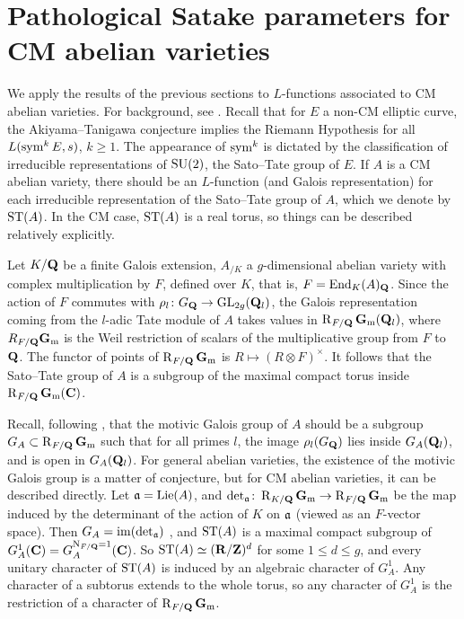 \section{Pathological Satake parameters for CM abelian varieties}

We apply the results of the previous sections to $L$-functions associated to 
CM abelian varieties. For background, see 
\cite{serre-tate-1968,serre-1994,yu-2015}. 
Recall that for $E$ a non-CM elliptic curve, the 
Akiyama--Tanigawa conjecture implies the Riemann Hypothesis for all 
$L(\operatorname{sym}^k E,s)$, $k\geqslant 1$. The appearance of $\operatorname{sym}^k$ is dictated by the 
classification of irreducible representations of $\operatorname{SU}(2)$, the Sato--Tate group 
of $E$. If $A$ is a CM abelian variety, there should be an $L$-function (and 
Galois representation) for each irreducible representation of the Sato--Tate 
group of $A$, which we denote by $\mathrm{ST}(A)$. In the 
CM case, $\mathrm{ST}(A)$ is a real torus, so things can be described relatively 
explicitly. 

Let $K/\mathbf{Q}$ be a finite Galois extension, $A_{/K}$ a $g$-dimensional abelian 
variety with complex multiplication by $F$, defined over $K$, that is, 
$F = \operatorname{End}_K(A)_{\mathbf{Q}}$. Since the action of $F$ commutes with 
$\rho_l\colon G_{\mathbf{Q}} \to \operatorname{GL}_{2g}(\mathbf{Q}_l)$, the Galois representation coming 
from the $l$-adic Tate module of $A$ takes values in $\operatorname{R}_{F/\mathbf{Q}}\mathbf{G}_\mathrm{m}(\mathbf{Q}_l)$, 
where $R_{F/\mathbf{Q}} \mathbf{G}_\mathrm{m}$ is the Weil restriction of scalars of the multiplicative 
group from $F$ to $\mathbf{Q}$. The functor of points of $\operatorname{R}_{F/\mathbf{Q}}\mathbf{G}_\mathrm{m}$ is 
$R\mapsto (R\otimes F)^\times$. It follows that the Sato--Tate group of $A$ is 
a subgroup of the maximal compact torus inside $\operatorname{R}_{F/\mathbf{Q}}\mathbf{G}_\mathrm{m}(\mathbf{C})$. 

Recall, following \cite{serre-1994}, that the motivic Galois group of $A$ 
should be a subgroup $G_A\subset \operatorname{R}_{F/\mathbf{Q}}\mathbf{G}_\mathrm{m}$ such that for all primes $l$, 
the image $\rho_l(G_{\mathbf{Q}})$ lies inside $G_A(\mathbf{Q}_l)$, and is open in 
$G_A(\mathbf{Q}_l)$. For general abelian varieties, the existence of the motivic 
Galois group is a matter of conjecture, but for CM abelian varieties, it can be 
described directly. Let $\mathfrak{a}=\operatorname{Lie}(A)$, and 
$\det_{\mathfrak{a}}\colon \operatorname{R}_{K/\mathbf{Q}}\mathbf{G}_\mathrm{m} \to \operatorname{R}_{F/\mathbf{Q}}\mathbf{G}_\mathrm{m}$ be the map induced by the 
determinant of the action of $K$ on $\mathfrak{a}$ (viewed as an $F$-vector space). Then 
$G_A = \operatorname{im}(\det_{\mathfrak{a}})$ \cite{yu-2015}, and $\mathrm{ST}(A)$ is a maximal compact 
subgroup of $G_A^1(\mathbf{C}) = G_A^{\operatorname{N}_{F/\mathbf{Q}} = 1}(\mathbf{C})$. So 
$\mathrm{ST}(A) \simeq (\mathbf{R}/\mathbf{Z})^d$ for some $1\leqslant d \leqslant g$, and every 
unitary character of $\mathrm{ST}(A)$ is induced by an algebraic character of 
$G_A^1$. Any character of a subtorus extends to the whole torus, so any 
character of $G_A^1$ is the restriction of a character of $\operatorname{R}_{F/\mathbf{Q}}\mathbf{G}_\mathrm{m}$. 

